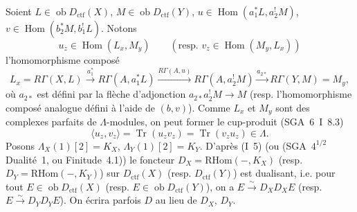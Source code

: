 \documentclass[11pt]{article}
\DeclareMathOperator{\Hom}{Hom}
\newcommand{\ob}{\operatorname{ob}}
\providecommand{\RHom}{\mathrm{RHom}}
\providecommand{\ctf}{\mathrm{ctf}}
\providecommand{\Tr}{\operatorname{Tr}}
\begin{document}
Soient $L\in \ob D_{\ctf}(X)$, $M\in \ob D_{\ctf}(Y)$, $u\in\Hom(a_1^*L,a_2^!M)$, $v\in\Hom(b_2^*M,b_1^!L)$. Notons
\[
u_z\in\Hom(L_x,M_y)\qquad (\text{resp. }v_z\in\Hom(M_y,L_x))
\]
l'homomorphisme composé
\[
L_x=R\Gamma(X,L)\xrightarrow{a_1^*}R\Gamma(A,a_1^*L)
\xrightarrow{R\Gamma(A,u)}R\Gamma(A,a_2^!M)
\xrightarrow{a_{2*}}R\Gamma(Y,M)=M_y,
\]
où $a_{2*}$ est défini par la flèche d'adjonction $a_{2*}a_2^!M\to M$ (resp. l'homomorphisme composé analogue défini à l'aide de $(b,v)$). Comme $L_x$ et $M_y$ sont des complexes parfaits de $\Lambda$-modules, on peut former le cup-produit (SGA~6~I~8.3)
\begin{equation}\tag{1.1.1}
\langle u_z,v_z\rangle=\Tr(u_zv_z)=\Tr(v_zu_z)\in\Lambda.
\end{equation}
Posons $\Lambda_X(1)[2]=K_X$, $\Lambda_Y(1)[2]=K_Y$. D'après (I~5) (ou (SGA~$4^{1/2}$ Dualité~1, ou Finitude~4.1)) le foncteur $D_X=\RHom(-,K_X)$ (resp. $D_Y=\RHom(-,K_Y)$) sur $D_{\ctf}(X)$ (resp. $D_{\ctf}(Y)$) est dualisant, i.e. pour tout $E\in\ob D_{\ctf}(X)$ (resp. $E\in\ob D_{\ctf}(Y)$), on a $E\xrightarrow{\sim}D_XD_XE$ (resp. $E\xrightarrow{\sim}D_YD_YE$). On écrira parfois $D$ au lieu de $D_X$, $D_Y$.
\end{document}

